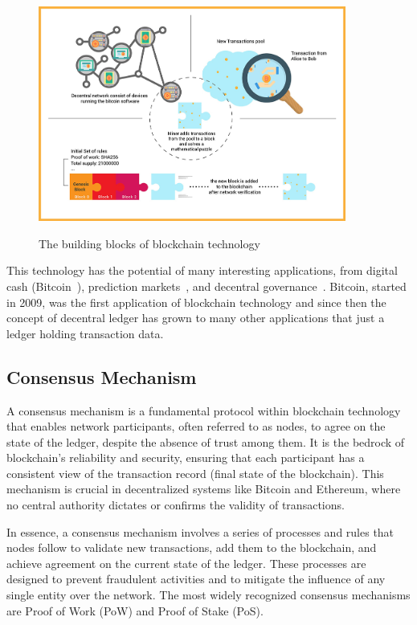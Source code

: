 \begin{figure}[h]
    \centering
    {\caption[The Building Blocks of Blockchain Technology]{The building blocks of blockchain technology}}
    {\includegraphics[width=0.9\textwidth]{figures/blockchain-buildingblocks.jpg}}
\end{figure}


This technology has the potential of many interesting applications, from digital cash (\eg Bitcoin~\cite{nakamoto2008bitcoin}), prediction markets~\cite{clark2014decentralizing}, and decentral governance~\cite{aragonwebsite}. Bitcoin, started in 2009, was the first application of blockchain technology and since then the concept of decentral ledger has grown to many other applications that just a ledger holding transaction data. 


\subsection{Consensus Mechanism}\label{consensus_mechanism}
A consensus mechanism is a fundamental protocol within blockchain technology that enables network participants, often referred to as nodes, to agree on the state of the ledger, despite the absence of trust among them. It is the bedrock of blockchain's reliability and security, ensuring that each participant has a consistent view of the transaction record (final state of the blockchain). This mechanism is crucial in decentralized systems like Bitcoin and Ethereum, where no central authority dictates or confirms the validity of transactions.

In essence, a consensus mechanism involves a series of processes and rules that nodes follow to validate new transactions, add them to the blockchain, and achieve agreement on the current state of the ledger. These processes are designed to prevent fraudulent activities and to mitigate the influence of any single entity over the network. The most widely recognized consensus mechanisms are Proof of Work (PoW) and Proof of Stake (PoS).


